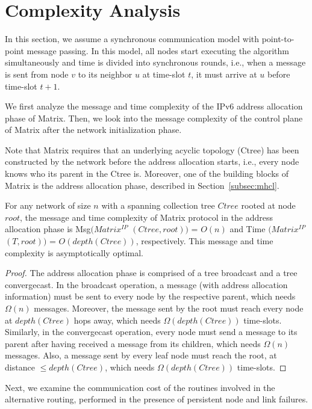 \section{Complexity Analysis}\label{sec:analysis}

In this section, we assume a synchronous communication model with point-to-point message passing. In this model, all nodes start executing the algorithm simultaneously and time is divided into synchronous rounds, i.e., when a message is sent from node $v$ to its neighbor $u$ at time-slot $t$, it must arrive at $u$ before time-slot $t+1$.

We first analyze the message and time complexity of the IPv6 address allocation phase of Matrix. Then, we look into the message complexity of the control plane of Matrix after the network initialization phase.

Note that Matrix requires that an underlying acyclic topology (Ctree) has been constructed by the network before the address allocation starts, i.e., every node knows who its parent in the Ctree is. Moreover, one of the building blocks of Matrix is the address allocation phase, described in Section~\ref{subsec:mhcl}.

\begin{theorem} For any network of size $n$ with a spanning collection tree $Ctree$ rooted at node $root$, the message and time complexity of Matrix protocol in the address allocation phase is Msg$(Matrix^{IP}$ $(Ctree, root))$ = $O(n)$ and Time $(Matrix^{IP}$ $(T, root))$ = $O(depth(Ctree))$, respectively. This message and time complexity is asymptotically optimal.
\end{theorem}

\begin{proof}
The address allocation phase is comprised of a tree broadcast and a tree convergecast. In the broadcast operation, a message (with address allocation information) must be sent to every node by the respective parent, which needs $\Omega(n)$ messages. Moreover, the message sent by the root must reach every node at $depth(Ctree)$ hops away, which needs $\Omega(depth(Ctree))$ time-slots. Similarly, in the convergecast operation, every node must send a message to its parent after having received a message from its children, which needs $\Omega(n)$ messages. Also, a message sent by every leaf node must reach the root, at distance $\leq depth(Ctree)$, which needs $\Omega(depth(Ctree))$
time-slots.
\end{proof}

Next, we examine the communication cost of the routines involved in the alternative routing, performed in the presence of persistent node and link failures.

